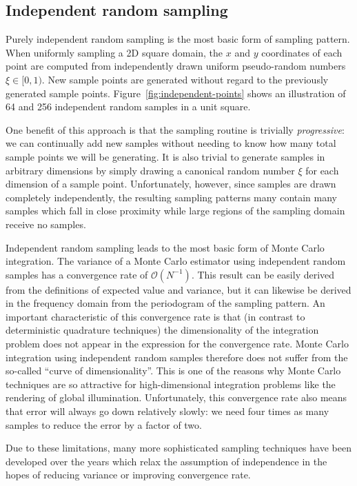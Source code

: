 \documentclass[11pt,fleqn]{book} %
\begin{document}
\subsection{Independent random sampling}

Purely independent random sampling is the most basic form of sampling pattern. When uniformly sampling a 2D square domain, the $x$ and $y$ coordinates of each point are computed from independently drawn uniform pseudo-random numbers $\xi \in [0,1)$. New sample points are generated without regard to the previously generated sample points. Figure~\ref{fig:independent-points} shows an illustration of 64 and 256 independent random samples in a unit square.

One benefit of this approach is that the sampling routine is trivially \textit{progressive}: we can continually add new samples without needing to know how many total sample points we will be generating. It is also trivial to generate samples in arbitrary dimensions by simply drawing a canonical random number $\xi$ for each dimension of a sample point. Unfortunately, however, since samples are drawn completely independently, the resulting sampling patterns many contain many samples which fall in close proximity while large regions of the sampling domain receive no samples.

%
%
%

Independent random sampling leads to the most basic form of Monte Carlo integration. The variance of a Monte Carlo estimator using independent random samples has a convergence rate of $\mathcal{O}(N^{-1})$. This result can be easily derived from the definitions of expected value and variance, but it can likewise be derived in the frequency domain from the periodogram of the sampling pattern. An important characteristic of this convergence rate is that (in contrast to deterministic quadrature techniques) the dimensionality of the integration problem does not appear in the expression for the convergence rate. Monte Carlo integration using independent random samples therefore does not suffer from the so-called ``curve of dimensionality''. This is one of the reasons why Monte Carlo techniques are so attractive for high-dimensional integration problems like the rendering of global illumination. Unfortunately, this convergence rate also means that error will always go down relatively slowly: we need four times as many samples to reduce the error by a factor of two.

Due to these limitations, many more sophisticated sampling techniques have been developed over the years which relax the assumption of independence in the hopes of reducing variance or improving convergence rate.
\end{document}
